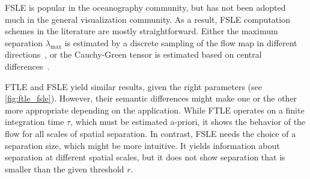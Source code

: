%
\ac{FSLE} is popular in the oceanography community, but has not been adopted
much in the general visualization community.
%
As a result, \ac{FSLE} computation schemes in the literature are mostly
straightforward.
%
Either the maximum separation $\lambda_{\text{max}}$ is estimated by a discrete
sampling of the flow map in different
directions~\cite{dOvidio2004,Hernandez-Carrasco2011}, or the Cauchy-Green tensor
is estimated based on central differences~\cite{Peikert2014}.
%

%
\ac{FTLE} and \ac{FSLE} yield similar results, given the right parameters (see
\cref{fig:ftle_fsle}).
%
However, their semantic differences might make one or the other more appropriate
depending on the application.
%
While \ac{FTLE} operates on a finite integration time $\tau$, which must be
estimated a-priori, it shows the behavior of the flow for all scales of spatial
separation.
%
In contrast, \ac{FSLE} needs the choice of a separation size, which might be
more intuitive.
%
It yields information about separation at different spatial scales, but it does
not show separation that is smaller than the given threshold $r$.
%
%
%
